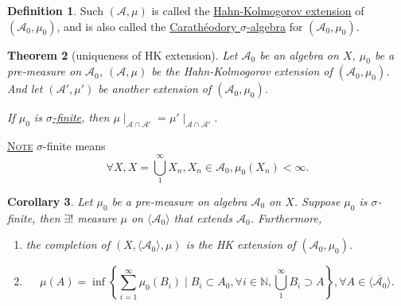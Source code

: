 \documentclass{report}
\newcommand{\N}{\mathbb{N}}
\newcommand{\fancyem}[1]{\underline{\textsc{#1}}}
\newtheorem{theorem}{Theorem}[chapter]
\newtheorem{corollary}[theorem]{Corollary}
\theoremstyle{definition}
\newtheorem{definition}[theorem]{Definition}
\theoremstyle{remark}
\begin{document}
\begin{definition}
Such $(\mathcal{A}, \mu)$ is called the \underline{Hahn-Kolmogorov extension} of $(\mathcal{A}_0, \mu_0)$, and is also called the \underline{Carathéodory $\sigma$-algebra} for $(\mathcal{A}_0, \mu_0)$.
\end{definition}

\begin{theorem}[uniqueness of HK extension]\label{th:hkunique}
Let $\mathcal{A}_0$ be an algebra on $X$, $\mu_0$ be a pre-measure on $\mathcal{A}_0$, $(\mathcal{A}, \mu)$ be the Hahn-Kolmogorov extension of $(\mathcal{A}_0, \mu_0)$.
And let $(\mathcal{A}', \mu')$ be another extension of $(\mathcal{A}_0, \mu_0)$.

If $\mu_0$ is \underline{$\sigma$-finite}, then $\mu \mid_{\mathcal{A} \cap \mathcal{A}'} = \mu' \mid_{\mathcal{A} \cap \mathcal{A}'}$.
\end{theorem}

\fancyem{Note} $\sigma$-finite means
\[\forall X, X = \bigcup_1^\infty X_n, X_n \in \mathcal{A}_0, \mu_0(X_n) < \infty.\]

\begin{corollary}
Let $\mu_0$ be a pre-measure on algebra $\mathcal{A}_0$ on $X$. Suppose $\mu_0$ is $\sigma$-finite, then $\exists!$ measure $\mu$ on $\langle \mathcal{A}_0 \rangle$ that extends $\mathcal{A}_0$. Furthermore, 
\begin{enumerate}
\item the completion of $(X, \langle \mathcal{A}_0 \rangle, \mu)$ is the HK extension of $(\mathcal{A}_0, \mu_0).$
\item 
\[
\mu(A) = \inf \left\{\sum_{i=1}^\infty \mu_0(B_i) \mid B_i \subset A_0, \forall i \in \N, \bigcup_1^\infty B_i \supset A\right\}, \forall A \in \overline{\langle \mathcal{A}_0\rangle}.
\]
\end{enumerate}
\end{corollary}
\end{document}
